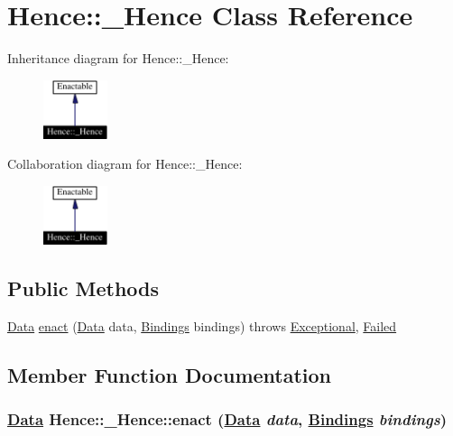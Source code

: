 \hypertarget{classHence_1_1__Hence}{
\section{Hence::\_\-Hence  Class Reference}
\label{classHence_1_1__Hence}
}
Inheritance diagram for Hence::\_\-Hence:\begin{figure}[H]
\begin{center}
\leavevmode
\includegraphics[width=53pt]{classHence_1_1__Hence__inherit__graph}
\end{center}
\end{figure}
Collaboration diagram for Hence::\_\-Hence:\begin{figure}[H]
\begin{center}
\leavevmode
\includegraphics[width=53pt]{classHence_1_1__Hence__coll__graph}
\end{center}
\end{figure}
\subsection*{Public Methods}
\begin{CompactItemize}
\item 
\hyperlink{interfaceData}{Data} \hyperlink{classHence_1_1__Hence_a0}{enact} (\hyperlink{interfaceData}{Data} data, \hyperlink{interfaceBindings}{Bindings} bindings) throws \hyperlink{classExceptional}{Exceptional}, \hyperlink{classFailed}{Failed}
\end{CompactItemize}


\subsection{Member Function Documentation}
\hypertarget{classHence_1_1__Hence_a0}{
\subsubsection[enact]{\setlength{\rightskip}{0pt plus 5cm}\hyperlink{interfaceData}{Data} Hence::\_\-Hence::enact (\hyperlink{interfaceData}{Data} {\em data}, \hyperlink{interfaceBindings}{Bindings} {\em bindings})}}
\label{classHence_1_1__Hence_a0}




